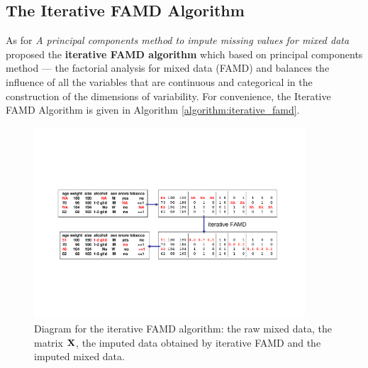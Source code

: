 \documentclass[a4paper,12pt,authoryear]{elegantpaper}
\begin{document}
    \subsection{The Iterative FAMD Algorithm}

    As for \textit{A principal components method to impute missing values for mixed data} \citet{audigier_principal_2013} proposed the \textbf{iterative FAMD algorithm} which based on principal components method --- the factorial analysis for mixed data (FAMD) and balances the influence of all the variables that are continuous and categorical in the construction of the dimensions of variability. For convenience, the Iterative FAMD Algorithm is given in Algorithm \ref{algorithm:iterative_famd}. 

    \begin{figure}[!hbt]
        \centering
        \includegraphics[width=0.9\textwidth]{./figures/algo_afdm.pdf}
        \caption{Diagram for the iterative FAMD algorithm: the raw mixed data, the matrix $\bf X$, the imputed data obtained by iterative FAMD and the imputed mixed data. \citep{audigier_principal_2013}}
    \end{figure}
\end{document}
